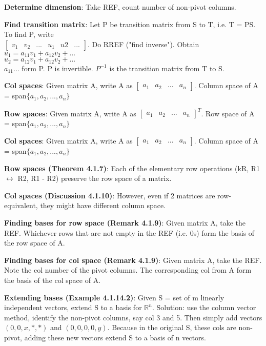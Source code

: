 \documentclass[a4paper,landscape]{article}
\newcommand{\rnname}[1]{\textbf{#1}}
\begin{document}
\begin{multicols*}{4}
\begin{flatitemize}
\item \rnname{Determine dimension}: Take REF, count number of non-pivot columns. 
\item \rnname{Find transition matrix}: Let P be transition matrix from S to T, i.e. T = PS.
To find P, write \\
$\begin{bmatrix} v_{1} & v_{2} & ... & u_{1} & u{2} & ... \end{bmatrix}$. Do RREF ("find inverse"). Obtain $u_{1} = a_{11}v_{1} + a_{12}v_{2} + ...$\\
$u_{2} = a_{12}v_{1} + a_{12}v_{2} + ...$\\
$a_{11}...$ form P. 
P is invertible. $P^{-1}$ is the transition matrix from T to S.
\item \rnname{Col spaces}: Given matrix A, write A as $\begin{bmatrix} a_{1} & a_{2} & ... & a_{n}\end{bmatrix}$. Column space of A = span$\lbrace a_{1}, a_{2}, ..., a_{n}\rbrace$
\item \rnname{Row spaces}: Given matrix A, write A as $\begin{bmatrix} a_{1} & a_{2} & ... & a_{n}\end{bmatrix}^{T}$. Row space of A = span$\lbrace a_{1}, a_{2}, ..., a_{n}\rbrace$
\item \rnname{Col spaces}: Given matrix A, write A as $\begin{bmatrix} a_{1} & a_{2} & ... & a_{n}\end{bmatrix}$. Column space of A = span$\lbrace a_{1}, a_{2}, ..., a_{n}\rbrace$
\item \rnname{Row spaces (Theorem 4.1.7)}: Each of the elementary row operations (kR, R1 $\leftrightarrow$ R2, R1 - R2) preserve the row space of a matrix.
\item \rnname{Col spaces (Discussion 4.1.10)}: However, even if 2 matrices are row-equivalent, they might have different column space.
\item \rnname{Finding bases for row space (Remark 4.1.9)}: Given matrix A, take the REF. Whichever rows that are not empty in the REF (i.e. 0s) form the basis of the row space of A.
\item \rnname{Finding bases for col space (Remark 4.1.9)}: Given matrix A, take the REF. Note the col number of the pivot columns. The corresponding col from A form the basis of the col space of A.
\item \rnname{Extending bases (Example 4.1.14.2)}: Given S = set of m linearly independent vectors, extend S to a basis for $\mathbb{R}^n$. Solution: use the column vector method, identify the non-pivot columns, say col 3 and 5. Then simply add vectors $\left(0,0,x,*,*\right)$ and $\left(0,0,0,0,y\right)$. Because in the original S, these cols are non-pivot, adding these new vectors extend S to a basis of n vectors.

\end{flatitemize}
\end{multicols*}
\end{document}
